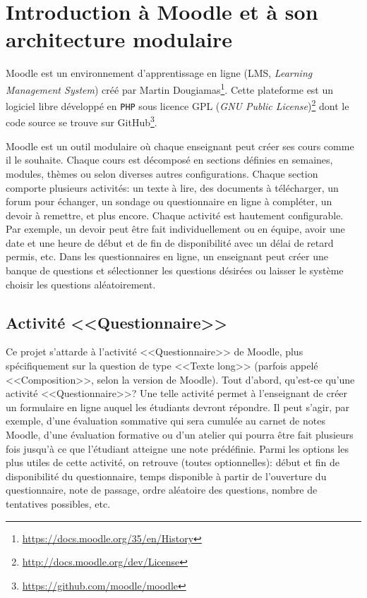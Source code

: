 \chapter{Introduction \`a Moodle et \`a son architecture modulaire}
Moodle est un environnement d'apprentissage en ligne (LMS, \textit{Learning Management System}) cr\'e\'e par Martin Dougiamas\footnote{\url{https://docs.moodle.org/35/en/History}}.
Cette plateforme est un logiciel libre d\'evelopp\'e en \texttt{PHP} sous licence GPL (\textit{GNU Public License})\footnote{\url{http://docs.moodle.org/dev/License}} dont le code source se trouve sur GitHub\footnote{\url{https://github.com/moodle/moodle}}.

Moodle est un outil modulaire o\`u chaque enseignant peut cr\'eer ses cours comme il le souhaite.
Chaque cours est d\'ecompos\'e en sections d\'efinies en semaines, modules, th\`emes ou selon diverses autres configurations.
Chaque section comporte plusieurs activit\'es: un texte \`a lire, des documents \`a t\'el\'echarger, un forum pour \'echanger, un sondage ou questionnaire en ligne \`a compl\'eter, un devoir \`a remettre, et plus encore.
Chaque activit\'e est hautement configurable.
Par exemple, un devoir peut \^etre fait individuellement ou en \'equipe, avoir une date et une heure de d\'ebut et de fin de disponibilit\'e avec un d\'elai de retard permis, etc.
Dans les questionnaires en ligne, un enseignant peut cr\'eer une banque de questions et s\'electionner les questions d\'esir\'ees ou laisser le syst\`eme choisir les questions al\'eatoirement.

\section{Activit\'e <<Questionnaire>>}
Ce projet s'attarde \`a l'activit\'e <<Questionnaire>> de Moodle, plus sp\'ecifiquement sur la question de type <<Texte long>> (parfois appel\'e <<Composition>>, selon la version de Moodle).
Tout d'abord, qu'est-ce qu'une activit\'e <<Questionnaire>>?
Une telle activit\'e permet \`a l'enseignant de cr\'eer un formulaire en ligne auquel les \'etudiants devront r\'epondre.
Il peut s'agir, par exemple, d'une \'evaluation sommative qui sera cumul\'ee au carnet de notes Moodle, d'une \'evaluation formative ou d'un atelier qui pourra \^etre fait plusieurs fois jusqu'\`a ce que l'\'etudiant atteigne une note pr\'ed\'efinie.
Parmi les options les plus utiles de cette activit\'e, on retrouve (toutes optionnelles): d\'ebut et fin de disponibilit\'e du questionnaire, temps disponible \`a partir de l'ouverture du questionnaire, note de passage, ordre al\'eatoire des questions, nombre de tentatives possibles, etc.

